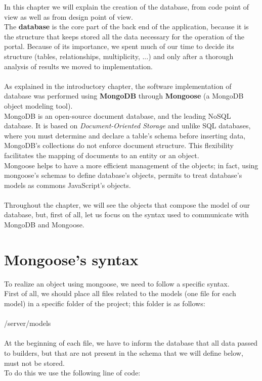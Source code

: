 In this chapter we will explain the creation of the database, from code point of view as well as from design point of view.
\\The \textbf{database} is the core part of the back end of the application, because it is the structure that keeps stored all the data necessary for the operation of the portal. Because of its importance, we spent much of our time to decide its structure (tables, relationships, multiplicity, ...) and only after a thorough analysis of results we moved to implementation.
\\
\\As explained in the introductory chapter, the software implementation of database was performed using \textbf{MongoDB} through \textbf{Mongoose} (a MongoDB object modeling tool).
\\MongoDB is an open-source document database, and the leading NoSQL database. It is based on \emph{Document-Oriented Storage} and unlike SQL databases, where you must determine and declare a table's schema before inserting data, MongoDB’s collections do not enforce document structure. This flexibility facilitates the mapping of documents to an entity or an object.
\\Mongoose helps to have a more efficient management of the objects; in fact, using mongoose's schemas to define database's objects, permits to treat database's models as commons JavaScript's objects.
\\
\\Throughout the chapter, we will see the objects that compose the model of our database, but, first of all, let us focus on the syntax used to communicate with MongoDB and Mongoose.

\section{Mongoose's syntax}
To realize an object using mongoose, we need to follow a specific syntax.
\\First of all, we should place all files related to the models (one file for each model) in a specific folder of the project; this folder is as follows:
\\
\\/server/models
\\
\\At the beginning of each file, we have to inform the database that all data passed to builders, but that are not present in the schema that we will define below, must not be stored.
\\To do this we use the following line of code:

